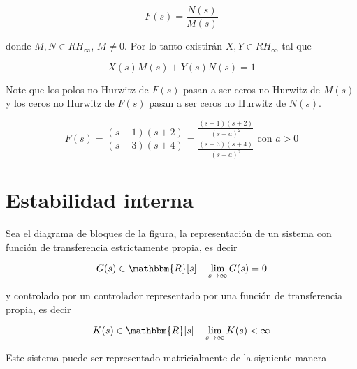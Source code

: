         \begin{equation*}
            F(s) = \frac{N(s)}{M(s)}
        \end{equation*}

        donde $M, N \in RH_{\infty}$, $M \ne 0$.
        Por lo tanto existirán $X, Y \in RH_{\infty}$ tal que

        \begin{equation}
            X(s) M(s) + Y(s) N(s) = 1
        \end{equation}

        Note que los polos no Hurwitz de $F(s)$ pasan a ser ceros no Hurwitz de $M(s)$ y los ceros no Hurwitz de $F(s)$ pasan a ser ceros no Hurwitz de $N(s)$.

        \begin{equation*}
            F(s) = \frac{(s-1)(s+2)}{(s-3)(s+4)} = \frac{\frac{(s-1)(s+2)}{(s+a)^2}}{\frac{(s-3)(s+4)}{(s+a)^2}} \text{ con } a > 0
        \end{equation*}


    \section{Estabilidad interna}

        Sea el diagrama de bloques de la figura, la representación de un sistema con función de transferencia estrictamente propia, es decir

        \begin{equation*}
            G(s) \in \mathbbm{R}[s] \quad \lim_{s \to \infty} G(s) = 0
        \end{equation*}

        y controlado por un controlador representado por una función de transferencia propia, es decir

        \begin{equation*}
            K(s) \in \mathbbm{R}[s] \quad \lim_{s \to \infty} K(s) < \infty
        \end{equation*}


        Este sistema puede ser representado matricialmente de la siguiente manera

